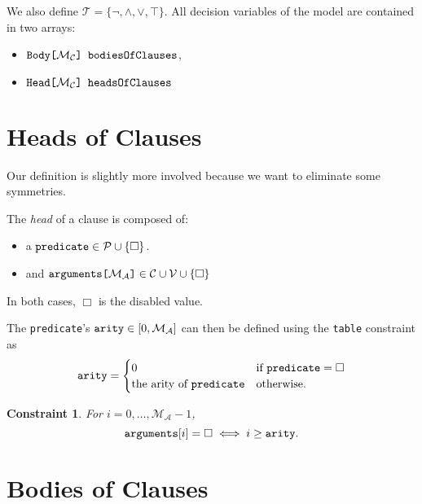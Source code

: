 \documentclass[runningheads]{llncs}
\newtheorem{constraint}{Constraint}
\newcommand{\variable}[1]{\texttt{\textup{#1}}}
\newcommand{\arrayd}[3]{\variable{{#1}[}{#2}\variable{]} \in {#3}}
\newcommand{\arrayt}[3]{\variable{{#3}[}{#2}\variable{] {#1}}}
\newcommand{\predicates}{\mathcal{P}}
\newcommand{\variables}{\mathcal{V}}
\newcommand{\constants}{\mathcal{C}}
\newcommand{\tokens}{\mathcal{T}}
\newcommand{\maxArity}{\mathcal{M}_{\mathcal{A}}}
\newcommand{\maxNumClauses}{\mathcal{M}_{\mathcal{C}}}
\begin{document}
We also define $\tokens{} = \{ \neg, \land, \lor, \top \}$. All decision
variables of the model are contained in two arrays:
\begin{itemize}
\item $\arrayt{bodiesOfClauses}{\maxNumClauses{}}{Body}$,
\item $\arrayt{headsOfClauses}{\maxNumClauses{}}{Head}$
\end{itemize}

\section{Heads of Clauses}

Our definition is slightly more involved because we want to eliminate some
symmetries.

\begin{definition}
  The \emph{head} of a clause is composed of:
  \begin{itemize}
  \item a $\variable{predicate} \in \predicates \cup \{ \Box \}$.
  \item and $\arrayd{arguments}{\maxArity{}}{\constants{} \cup \variables{}}
    \cup \{ \Box \}$
  \end{itemize}
  In both cases, $\Box$ is the disabled value.
\end{definition}

\begin{definition}
  The \variable{predicate}'s $\variable{arity} \in [0, \maxArity{}]$ can then be
  defined using the \variable{table} constraint as
  \[
    \variable{arity} = \begin{cases}
      0 & \text{if } \variable{predicate} = \Box\\
      \text{the arity of } \variable{predicate} & \text{otherwise.}
    \end{cases}
  \]
\end{definition}

\begin{constraint}
  For $i = 0, \dots, \maxArity{} - 1$,
  \[
    \variable{arguments}[i] = \Box \iff i \ge \variable{arity}.
  \]
\end{constraint}

\section{Bodies of Clauses}
\end{document}

